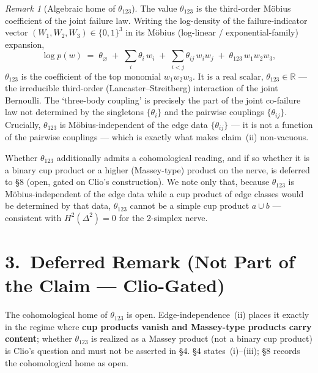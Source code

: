 \documentclass[11pt,a4paper]{article}
\theoremstyle{conjstyle}
\theoremstyle{remark}
\newtheorem*{remark}{Remark}
\begin{document}
\begin{remark}[Algebraic home of $\theta_{123}$]
The value $\theta_{123}$ is the third-order M\"{o}bius coefficient of the joint
failure law.  Writing the log-density of the failure-indicator vector
$(W_1, W_2, W_3) \in \{0,1\}^3$ in its M\"{o}bius (log-linear /
exponential-family) expansion,
\[
  \log p(w) \;=\; \theta_\varnothing
  \;+\; \sum_i \theta_i\, w_i
  \;+\; \sum_{i<j} \theta_{ij}\, w_i w_j
  \;+\; \theta_{123}\, w_1 w_2 w_3,
\]
$\theta_{123}$ is the coefficient of the top monomial $w_1 w_2 w_3$.
It is a real scalar, $\theta_{123} \in \mathbb{R}$ --- the irreducible
third-order (Lancaster--Streitberg) interaction of the joint Bernoulli.
The `three-body coupling' is precisely the part of the joint co-failure law
not determined by the singletons $\{\theta_i\}$ and the pairwise couplings
$\{\theta_{ij}\}$.  Crucially, $\theta_{123}$ is M\"{o}bius-independent of the
edge data $\{\theta_{ij}\}$ --- it is not a function of the pairwise couplings
--- which is exactly what makes claim~(ii) non-vacuous.

Whether $\theta_{123}$ additionally admits a cohomological reading, and if so
whether it is a binary cup product or a higher (Massey-type) product on the
nerve, is deferred to \S8 (open, gated on Clio's construction).  We note only
that, because $\theta_{123}$ is M\"{o}bius-independent of the edge data while a
cup product of edge classes would be determined by that data, $\theta_{123}$
cannot be a simple cup product $a \cup b$ --- consistent with
$H^2(\Delta^2) = 0$ for the 2-simplex nerve.
\end{remark}

\section*{3.\ Deferred Remark (Not Part of the Claim --- Clio-Gated)}

The cohomological home of $\theta_{123}$ is open.  Edge-independence~(ii) places
it exactly in the regime where \textbf{cup products vanish and Massey-type
products carry content}; whether $\theta_{123}$ is realized as a Massey product
(not a binary cup product) is Clio's question and must not be asserted in \S4.
\S4 states~(i)--(iii); \S8 records the cohomological home as open.

\end{document}
